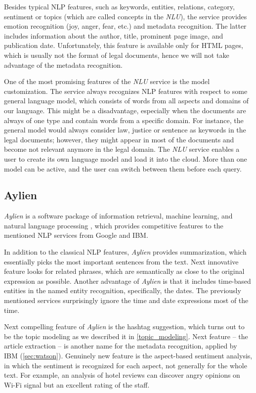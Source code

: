 \documentclass[
  digital, %
  notable,   %
  nolof,     %
  nolot,     %
]{fithesis3}
\begin{document}
Besides typical NLP features, such as keywords, entities, relations, category, sentiment or topics (which are called concepts in the \textit{NLU}), the service provides emotion recognition (joy, anger, fear, etc.) and metadata recognition.
The latter includes information about the author, title, prominent page image, and publication date.
Unfortunately, this feature is available only for HTML pages, which is usually not the format of legal documents, hence we will not take advantage of the metadata recognition.

One of the most promising features of the \textit{NLU} service is the model customization.
The service always recognizes NLP features with respect to some general language model, which consists of words from all aspects and domains of our language.
This might be a disadvantage, especially when the documents are always of one type and contain words from a specific domain.
For instance, the general model would always consider law, justice or sentence as keywords in the legal documents; however, they might appear in most of the documents and become not relevant anymore in the legal domain.
The \textit{NLU} service enables a user to create its own language model and load it into the cloud.
More than one model can be active, and the user can switch between them before each query.

\subsection{Aylien}
\textit{Aylien} is a software package of information retrieval, machine learning, and natural language processing \cite{aylienNLP}, which provides competitive features to the mentioned NLP services from Google and IBM.

In addition to the classical NLP features, \textit{Aylien} provides summarization, which essentially picks the most important sentences from the text. Next innovative feature looks for related phrases, which are semantically as close to the original expression as possible. Another advantage of \textit{Aylien} is that it includes time-based entities in the named entity recognition, specifically, the dates. The previously mentioned services surprisingly ignore the time and date expressions most of the time.

Next compelling feature of \textit{Aylien} is the hashtag suggestion, which turns out to be the topic modeling as we described it in \ref{topic_modeling}.
Next feature -- the article extraction -- is another name for the metadata recognition, applied by IBM (\ref{sec:watson}).
Genuinely new feature is the aspect-based sentiment analysis, in which the sentiment is recognized for each aspect, not generally for the whole text.
For example, an analysis of hotel reviews can discover angry opinions on Wi-Fi signal but an excellent rating of the staff.
\end{document}
